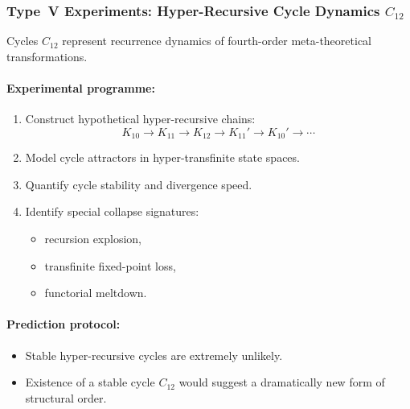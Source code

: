 \subsubsection{Type~V Experiments: Hyper-Recursive Cycle Dynamics $C_{12}$}

Cycles $C_{12}$ represent recurrence dynamics of fourth-order
meta-theoretical transformations.

\paragraph{Experimental programme:}

\begin{enumerate}
    \item Construct hypothetical hyper-recursive chains:
          \[
              K_{10} \rightarrow K_{11} \rightarrow K_{12}
                \rightarrow K_{11}' \rightarrow K_{10}'
                \rightarrow \cdots
          \]
    \item Model cycle attractors in hyper-transfinite state spaces.
    \item Quantify cycle stability and divergence speed.
    \item Identify special collapse signatures:
          \begin{itemize}
              \item recursion explosion,
              \item transfinite fixed-point loss,
              \item functorial meltdown.
          \end{itemize}
\end{enumerate}

\paragraph{Prediction protocol:}

\begin{itemize}
    \item Stable hyper-recursive cycles are extremely unlikely.
    \item Existence of a stable cycle $C_{12}$ would suggest a
          dramatically new form of structural order.
\end{itemize}



